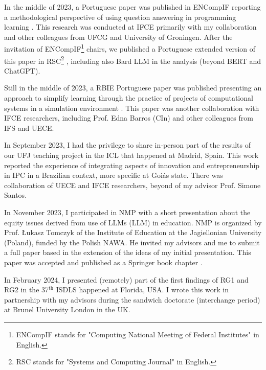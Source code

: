 In the middle of 2023, a Portuguese paper was published in \gls{ENCompIF} reporting a methodological perspective of using question answering in programming learning \cite{freire:2023-encompif}. This research was conducted at \gls{IFCE} primarily with my collaboration and other colleagues from \gls{UFCG} and University of Groningen. After the invitation of \gls{ENCompIF}\footnote{ENCompIF stands for "Computing National Meeting of Federal Institutes" in English.} chairs, we published a Portuguese extended version of this paper in \gls{RSC}\footnote{RSC stands for "Systems and Computing Journal" in English.} \cite{freire:2023-rsc}, including also Bard \gls{LLM} in the analysis (beyond \gls{BERT} and ChatGPT).

Still in the middle of 2023, a \gls{RBIE} Portuguese paper was published presenting an approach to simplify learning through the practice of projects of computational systems in a simulation environment \cite{esmeraldo:2023}. This paper was another collaboration with \gls{IFCE} researchers, including Prof. Edna Barros (\acrfull{CIn}) and other colleagues from \gls{IFS} and \gls{UECE}.

In September 2023, I had the privilege to share in-person part of the results of our \gls{UFJ} teaching project \cite{boaventura:2023} in the \gls{ICL} that happened at Madrid, Spain. This work reported the experience of integrating aspects of innovation and entrepreneurship in \gls{IPC} in a Brazilian context, more specific at Goiás state. There was collaboration of \gls{UECE} and \gls{IFCE} researchers, beyond of my advisor Prof. Simone Santos.

In November 2023, I participated in \acrfull{NMP} with a short presentation about the equity issues derived from use of \acrlong{LLM}s (\acrshort{LLM}) in education. \gls{NMP} is organized by Prof. Łukasz Tomczyk of the Institute of Education at the Jagiellonian University (Poland), funded by the Polish \gls{NAWA}. He invited my advisors and me to submit a full paper based in the extension of the ideas of my initial presentation. This paper was accepted and published as a Springer book chapter \cite{bispojr:2024-nmp}.

In February 2024, I presented (remotely) part of the first findings of \gls{RG}1 and \gls{RG}2 \cite{bispojr:2024-isdls} in the 37$^{\mbox{th}}$ \gls{ISDLS} happened at Florida, \acrfull{USA}. I wrote this work in partnership with my advisors during the sandwich doctorate (interchange period) at Brunel University London in the \acrfull{UK}.

